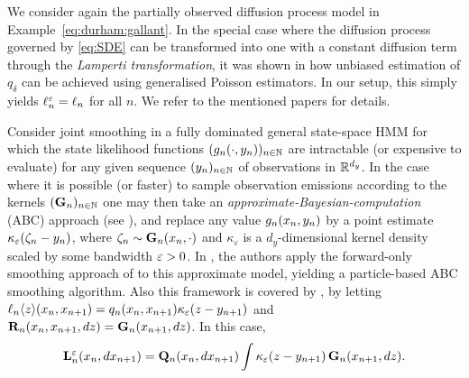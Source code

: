 \begin{example} \label{ex:exact:algorithm}
We consider again the partially observed diffusion process model in Example~\ref{eq:durham:gallant}. In the special case where the diffusion process governed by \eqref{eq:SDE} can be transformed into one with a constant diffusion term through the \emph{Lamperti transformation}, it was shown in \cite{beskos:papaspiliopoulos:roberts:fearnhead:2006,fearnhead2008particle} how unbiased estimation of $q_\delta$ can be achieved using generalised Poisson estimators. In our setup, this simply yields $\ell^\varepsilon_{n} = \ell_{n}$ for all $n$. We refer to the mentioned papers for details. 
\end{example}

\begin{example} 
Consider joint smoothing in a fully dominated general state-space HMM for which the state likelihood functions $(g_{n}(\cdot, y_n))_{n \in \mathbb{N}}$ are intractable (or expensive to evaluate) for any given sequence $(y_n)_{n \in \mathbb{N}}$ of observations in $\mathbb{R}^{d_y}$. In the case where it is possible (or faster) to sample observation emissions according to the kernels $(\mathbf{G}_n)_{n \in \mathbb{N}}$ one may then 
take an \emph{approximate-Bayesian-computation} (ABC) approach (see {\eg}  \cite{marin:pudlo:robert:ryder:2012}), and replace any value $g_{n}(x_n, y_n)$ by a point estimate $\kappa_\varepsilon(\zeta_n - y_n)$, where $\zeta_n \sim \mathbf{G}_n(x_n, \cdot)$ and $\kappa_\varepsilon$ is a $d_y$-dimensional kernel density scaled by some bandwidth $\varepsilon > 0$. In \cite{martin:jasra:singh:whiteley:delmoral:maccoy:2014}, the authors apply the forward-only smoothing approach of \cite{delmoral:doucet:singh:2010} to this approximate model, yielding a particle-based ABC smoothing algorithm. Also this framework is covered by , by letting $\ell_{n} \langle z \rangle(x_n, x_{n + 1}) = q_{n}(x_n, x_{n + 1}) \kappa_\varepsilon(z - y_{n + 1})$ and $\mathbf{R}_{n}(x_n, x_{n + 1}, d z) = \mathbf{G}_n(x_{n + 1}, d z)$. In this case, 
\begin{equation} \label{eq:ukmod:ABC:smoothing}
\ukmod{n}(x_n, \rmd x_{n + 1}) = \hk_n(x_n, \rmd x_{n + 1}) \int \kappa_\precpar(z - y_{n + 1}) \, \mk_n(x_{n + 1}, \rmd z). 
\end{equation}
\end{example}


